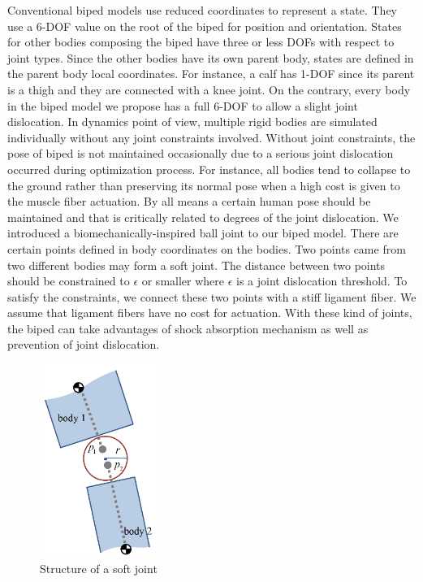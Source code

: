 \documentclass{acm_proc_article-sp}
\begin{document}
Conventional biped models use reduced coordinates to represent a state.
They use a 6-DOF value on the root of the biped for position and orientation.
States for other bodies composing the biped have three or less DOFs with respect to joint types.
Since the other bodies have its own parent body, states are defined in the parent body local coordinates.
For instance, a calf has 1-DOF since its parent is a thigh and they are connected with a knee joint.
On the contrary, every body in the biped model we propose has a full 6-DOF to allow a slight joint dislocation.
In dynamics point of view, multiple rigid bodies are simulated individually without any joint constraints involved.
Without joint constraints, the pose of biped is not maintained occasionally due to a serious joint dislocation occurred during optimization process.
For instance, all bodies tend to collapse to the ground rather than preserving its normal pose when a high cost is given to the muscle fiber actuation.
By all means a certain human pose should be maintained and that is critically related to degrees of the joint dislocation.
We introduced a biomechanically-inspired ball joint to our biped model.
There are certain points defined in body coordinates on the bodies.
Two points came from two different bodies may form a soft joint.
The distance between two points should be constrained to $\epsilon$ or smaller where $\epsilon$ is a joint dislocation threshold.
To satisfy the constraints, we connect these two points with a stiff ligament fiber.
We assume that ligament fibers have no cost for actuation.
With these kind of joints, the biped can take advantages of shock absorption mechanism as well as prevention of joint dislocation.

\begin{figure}[h!]
  \centering
  \includegraphics[width=1.5in]{softjoint}
  \caption{Structure of a soft joint}
\end{figure}
\end{document}
